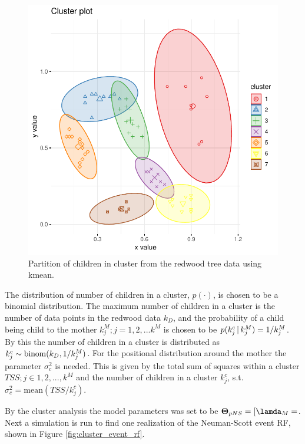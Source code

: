 \begin{figure}
    \centering
    \includegraphics[scale=0.95]{figures/redwood_cluster_partitioning.pdf}
    \caption{Partition of children in cluster from the redwood tree data using kmean.}
    \label{fig:cluster_part}
\end{figure}

The distribution of number of children in a cluster, $p(\cdot)$, is chosen to be a binomial distribution. The maximum number of children in a cluster is the number of data points in the redwood data $k_D$, and the probability of a child being child to the mother $k_j^M;j=1,2,...k^M$ is chosen to be $p(k_j^c \, | \, k_j^M) = 1/k_j^M$. By this the number of children in a cluster is distributed as $k_j^c \sim \mathrm{binom}(k_D,1/k_j^M)$. For the positional distribution around the mother the parameter $\sigma_c^2$ is needed. This is given by the total sum of squares within a cluster $TSS; j\in 1,2,...,k^M$ and the number of children in a cluster $k_j^c$, s.t. $\sigma_c^2 = \mathrm{mean}(TSS/k_j^c)$.

By the cluster analysis the model parameters was set to be $\vect{\Theta}_{pNS} = [\lamda_M = $. Next a simulation is run to find one realization of the Neuman-Scott event RF, shown in Figure \ref{fig:cluster_event_rf}.

